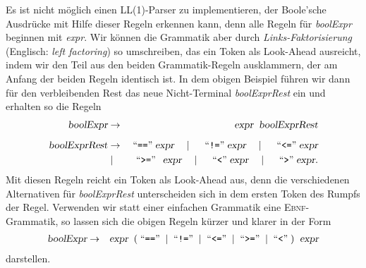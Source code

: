\noindent
Es ist nicht möglich einen LL(1)-Parser zu implementieren, der Boole'sche Ausdrücke
mit Hilfe dieser Regeln  erkennen kann, denn alle Regeln für \textsl{boolExpr} beginnen
mit \textsl{expr}.  Wir können die Grammatik aber durch \emph{Links-Faktorisierung}
(Englisch: \emph{left factoring})  
so umschreiben, das ein Token als Look-Ahead ausreicht, indem wir den Teil aus den beiden 
Grammatik-Regeln ausklammern, der am Anfang der beiden Regeln identisch ist.  In dem
obigen Beispiel führen wir dann für den verbleibenden Rest das neue Nicht-Terminal
\textsl{boolExprRest} ein und erhalten so die Regeln
\begin{eqnarray*}
\textsl{boolExpr}     & \rightarrow & \;\textsl{expr} \;\;\textsl{boolExprRest} \\[0.2cm]
\textsl{boolExprRest} & \rightarrow & \;\mbox{``\texttt{==}''}\;    \textsl{expr} \quad \mid \quad \;\mbox{``\texttt{!=}''}\; \textsl{expr}
                                      \quad \mid \quad \;\mbox{``\texttt{<=}''}\; \textsl{expr}                                  \\
                      & \mid        & \;\mbox{``\texttt{>=}''}\;\;\, \textsl{expr} \quad \mid \quad \;\mbox{``\texttt{<}''}\; \textsl{expr} 
                                      \quad \mid \quad \;\mbox{``\texttt{>}''}\; \textsl{expr}. 
\end{eqnarray*}
Mit diesen Regeln reicht ein Token als Look-Ahead aus, denn die verschiedenen Alternativen für 
\mbox{\textsl{boolExprRest}} unterscheiden sich in dem ersten Token des Rumpfs der Regel.
Verwenden wir statt einer einfachen Grammatik eine \textsc{Ebnf}-Grammatik, so lassen sich die 
obigen Regeln kürzer und klarer in der Form
\begin{eqnarray*}
\textsl{boolExpr} & \rightarrow & \textsl{expr}\;\;
                                  (\;\mbox{``\texttt{==}''}\;\mid \;\mbox{``\texttt{!=}''}\;\mid \;\mbox{``\texttt{<=}''}\; \mid \;\mbox{``\texttt{>=}''}\; \mid \;\mbox{``\texttt{<}''}\;)  
                                  \;\;\textsl{expr} 
\end{eqnarray*}
darstellen.


